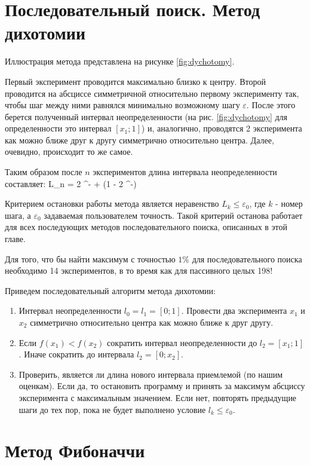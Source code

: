 \section{Последовательный поиск. Метод дихотомии}
Иллюстрация метода представлена на рисунке \ref{fig:dychotomy}.

Первый эксперимент проводится максимально близко к центру. Второй проводится на абсциссе симметричной относительно первому эксперименту так, чтобы шаг между ними равнялся минимально возможному шагу $\varepsilon$. После этого берется полученный интервал неопределенности (на рис. \ref{fig:dychotomy} для определенности это интервал $[x_1; 1]$) и, аналогично, проводятся 2 эксперимента как можно ближе друг к другу симметрично относительно центра. Далее, очевидно, происходит то же самое.

Таким образом после $n$ экспериментов длина интервала неопределенности составляет:
\be
L_n = 2 ^{-} + \left(1 - 2 ^{-}\right)\varepsilon
\ee

Критерием остановки работы метода является неравенство $L_k \leqslant \varepsilon_0$, где $k$ - номер шага, а $\varepsilon_0$ задаваемая пользователем точность. Такой критерий останова работает для всех последующих методов последовательного поиска, описанных в этой главе. 

Для того, что бы найти максимум с точностью $1\%$ для последовательного поиска необходимо 14 экспериментов, в то время как для пассивного целых 198! 

Приведем последовательный алгоритм метода дихотомии:
\begin{enumerate}
    \item Интервал неопределенности $l_0 = l_1 = [0;1]$. Провести два эксперимента $x_1$ и $x_2$ симметрично относительно центра как можно ближе к друг другу.
    \item Если $f(x_1) < f(x_2)$ сократить интервал неопределенности до $l_2 = [x_1; 1]$. Иначе сократить до интервала $l_2 = [0; x_2]$.
    \item Проверить, является ли длина нового интервала приемлемой (по нашим оценкам). Если да, то остановить программу и принять за максимум абсциссу эксперимента с максимальным значением. Если нет, повторять предыдущие шаги до тех пор, пока не будет выполнено условие $l_k \leqslant \varepsilon_0$.
\end{enumerate}

\section{Метод Фибоначчи}

